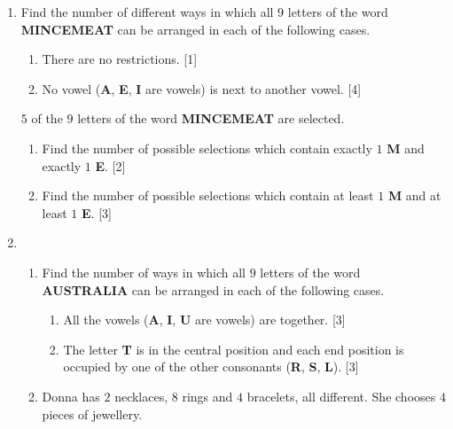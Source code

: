 \documentclass[a4paper]{article}
\begin{document}
\begin{enumerate}
	
	
	\item Find the number of different ways in which all $9$ letters of the word \textbf{MINCEMEAT} can be arranged in	each of the following cases. 
	\begin{enumerate}[label=(\roman*)]
		\item There are no restrictions.  \hfill[1]
		\vspace{2cm}
		\item No vowel (\textbf{A}, \textbf{E}, \textbf{I} are vowels) is next to another vowel. \hfill[4]
		
		\vspace{2cm}
	\end{enumerate}
	$5$ of the $9$ letters of the word \textbf{MINCEMEAT} are selected.
	\begin{enumerate}[resume,label=(\roman*)]
		\item Find the number of possible selections which contain exactly $1$ \textbf{M} and exactly $1$ \textbf{E}. \hfill[2]
		\vspace{2cm}
		\item  Find the number of possible selections which contain at least $1$ \textbf{M} and at least $1$ \textbf{E}. \hfill[3]
		\vspace{2cm}
	\end{enumerate}
	
	
	
	
	\item  \begin{enumerate}[label=(\roman*)]
		\item Find the number of ways in which all $9$ letters of the word \textbf{AUSTRALIA} can be arranged in each of the following cases.
		
		\begin{enumerate}[label=(\alph*)]
			\item All the vowels (\textbf{A}, \textbf{I}, \textbf{U} are vowels) are together. \hfill [3]
			\vspace{3cm}
			\item The letter \textbf{T} is in the central position and each end position is occupied by one of the other consonants (\textbf{R}, \textbf{S}, \textbf{L}). \hfill [3]
			\vspace{3cm}
		\end{enumerate}
		\item Donna has $2$ necklaces, $8$ rings and $4$ bracelets, all different. She chooses $4$ pieces of jewellery.
		

\end{enumerate}
\end{enumerate}
\end{document}
